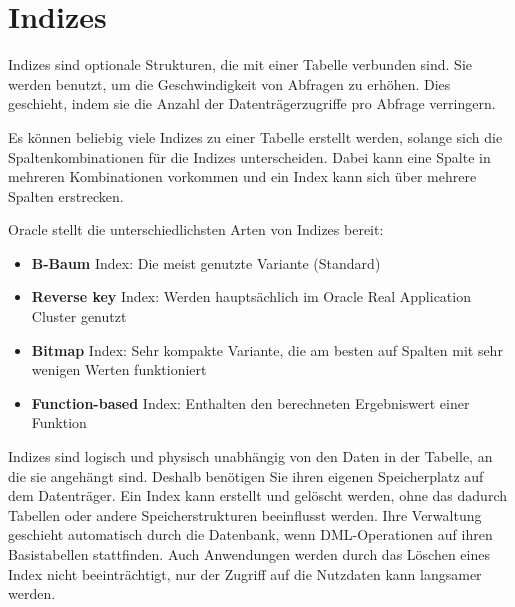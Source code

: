     \section{Indizes}
      Indizes sind optionale Strukturen, die mit einer Tabelle verbunden sind. Sie werden benutzt, um die Geschwindigkeit von Abfragen zu erh\"ohen. Dies geschieht, indem sie die Anzahl der Datentr\"agerzugriffe pro Abfrage verringern.

      Es k\"onnen beliebig viele Indizes zu einer Tabelle erstellt werden, solange sich die Spaltenkombinationen f\"ur die Indizes unterscheiden. Dabei kann eine Spalte in mehreren Kombinationen vorkommen und ein Index kann sich \"uber mehrere Spalten erstrecken.

      Oracle stellt die unterschiedlichsten Arten von Indizes bereit:
      \begin{itemize}
        \item \textbf{B-Baum} Index: Die meist genutzte Variante (Standard)
        \item \textbf{Reverse key} Index: Werden haupts\"achlich im Oracle Real Application Cluster genutzt
        \item \textbf{Bitmap} Index: Sehr kompakte Variante, die am besten auf Spalten mit sehr wenigen Werten funktioniert
        \item \textbf{Function-based} Index: Enthalten den berechneten Ergebniswert einer Funktion
      \end{itemize}
\clearpage
      Indizes sind logisch und physisch unabh\"angig von den Daten in der Tabelle, an die sie angeh\"angt sind. Deshalb ben\"otigen Sie ihren eigenen Speicherplatz auf dem Datentr\"ager. Ein Index kann erstellt und gel\"oscht werden, ohne das dadurch Tabellen oder andere Speicherstrukturen beeinflusst werden. Ihre Verwaltung geschieht automatisch durch die Datenbank, wenn DML-Operationen auf ihren Basistabellen stattfinden. Auch Anwendungen werden durch das L\"oschen eines Index nicht beeintr\"achtigt, nur der Zugriff auf die Nutzdaten kann  langsamer werden.
